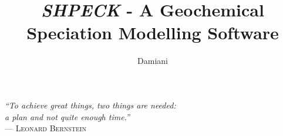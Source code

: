 \documentclass[ppgc,mestrado,english]{iiufrgs}
\title{\emph{SHPECK} - A Geochemical Speciation Modelling Software}
\author{Damiani}{Leonardo Hax}
\begin{document}
	
\renewcommand{\lstlistingname}{Code}

\maketitle

\clearpage
\begin{flushright}
\mbox{}\vfill
{\sffamily\itshape
``To achieve great things, two things are needed:\\
 a plan and not quite enough time.''\\}
--- \textsc{Leonard Bernstein}
\end{flushright}
\renewcommand*\bibname{References}

\renewcommand*\contentsname{Summary}
\tableofcontents

\end{document}
